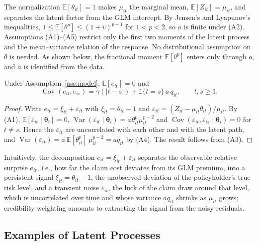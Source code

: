 \documentclass[mathematics,article,submit,moreauthors]{Definitions/mdpi}
\DeclareMathOperator{\Var}{Var}
\DeclareMathOperator{\Cov}{Cov}
\newcommand{\E}{\mathbb{E}}
\begin{document}
The normalization $\E[\theta_{it}]=1$ makes $\mu_{it}$ the marginal mean, $\E[Z_{it}]=\mu_{it}$, and separates the latent factor from the GLM intercept. By Jensen's and Lyapunov's inequalities, $1\le\E[\theta^p]\le(1+v)^{p-1}$ for $1<p<2$, so $a$ is finite under (A2). Assumptions (A1)--(A5) restrict only the first two moments of the latent process and the mean--variance relation of the response. No distributional assumption on $\theta$ is needed. As shown below, the fractional moment $\E[\theta^p]$ enters only through $a$, and $a$ is identified from the data.

\begin{Lemma}\label{lem:moments}
Under Assumption~\ref{ass:model}, $\E[e_{it}]=0$ and
\begin{equation}\label{eq:moments}
\Cov(e_{it},e_{is})=\gamma(|t-s|)+\mathds{1}\{t=s\}\,a\,q_{it},\qquad t,s\ge1 .
\end{equation}
\end{Lemma}

\begin{proof}
Write $e_{it}=\xi_{it}+\varepsilon_{it}$ with $\xi_{it}=\theta_{it}-1$ and $\varepsilon_{it}=(Z_{it}-\mu_{it}\theta_{it})/\mu_{it}$. By (A1), $\E[\varepsilon_{it}\mid\boldsymbol\theta_i]=0$, $\Var(\varepsilon_{it}\mid\boldsymbol\theta_i)=\phi\theta_{it}^p\mu_{it}^{p-2}$ and $\Cov(\varepsilon_{it},\varepsilon_{is}\mid\boldsymbol\theta_i)=0$ for $t\ne s$. Hence the $\varepsilon_{it}$ are uncorrelated with each other and with the latent path, and $\Var(\varepsilon_{it})=\phi\,\E[\theta_{it}^p]\,\mu_{it}^{p-2}=a q_{it}$ by (A4). The result follows from (A3).
\end{proof}

Intuitively, the decomposition $e_{it}=\xi_{it}+\varepsilon_{it}$ separates the observable relative surprise $e_{it}$, i.e., how far the claim cost deviates from its GLM premium, into a persistent signal $\xi_{it}=\theta_{it}-1$, the unobserved deviation of the policyholder's true risk level, and a transient noise $\varepsilon_{it}$, the luck of the claim draw around that level, which is uncorrelated over time and whose variance $a q_{it}$ shrinks as $\mu_{it}$ grows; credibility weighting amounts to extracting the signal from the noisy residuals.

\subsection{Examples of Latent Processes}\label{sec:examples}
\end{document}
